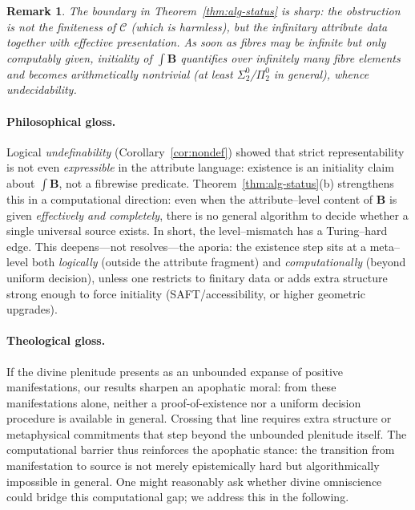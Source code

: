 \documentclass[11pt]{article}
\theoremstyle{upright}
\newtheorem{remark}{Remark}
\begin{document}
\begin{remark}
The boundary in Theorem~\ref{thm:alg-status} is sharp: the obstruction is not the finiteness of $\mathcal C$ (which is harmless), but the \emph{infinitary} attribute data together with effective presentation. As soon as fibres may be infinite but only computably given, initiality of $\int\!\mathbf B$ quantifies over infinitely many fibre elements and becomes arithmetically nontrivial (at least $\Sigma^0_2$/$\Pi^0_2$ in general), whence undecidability.
\end{remark}

\paragraph{Philosophical gloss.}
Logical \emph{undefinability} (Corollary~\ref{cor:nondef}) showed that strict representability is not even \emph{expressible} in the attribute language: existence is an initiality claim about $\int\!\mathbf B$, not a fibrewise predicate. Theorem~\ref{thm:alg-status}(b) strengthens this in a computational direction: even when the attribute–level content of $\mathbf B$ is given \emph{effectively and completely}, there is no general algorithm to decide whether a single universal source exists. In short, the level–mismatch has a Turing–hard edge. This deepens—not resolves—the aporia: the existence step sits at a meta–level both \emph{logically} (outside the attribute fragment) and \emph{computationally} (beyond uniform decision), unless one restricts to finitary data or adds extra structure strong enough to force initiality (SAFT/accessibility, or higher geometric upgrades). 

\paragraph{Theological gloss.} If the divine plenitude presents as an unbounded expanse of positive manifestations, our results sharpen an apophatic moral: from these manifestations alone, neither a proof-of-existence nor a uniform decision procedure is available in general. Crossing that line requires extra structure or metaphysical commitments that step beyond  the unbounded plenitude itself. The computational barrier thus reinforces the apophatic stance: the transition from manifestation to source is not merely epistemically hard but algorithmically impossible in general. One might reasonably ask whether divine omniscience could bridge this computational gap; we address this in the following.
\end{document}
